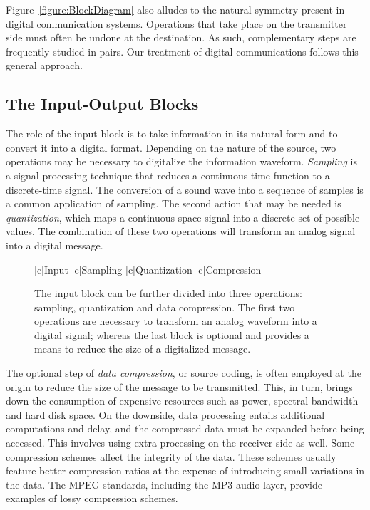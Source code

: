 Figure~\ref{figure:BlockDiagram} also alludes to the natural symmetry present in digital communication systems.
Operations that take place on the transmitter side must often be undone at the destination.
As such, complementary steps are frequently studied in pairs.
Our treatment of digital communications follows this general approach.


\subsection{The Input-Output Blocks}

The role of the input block is to take information in its natural form and to convert it into a digital format.
Depending on the nature of the source, two operations may be necessary to digitalize the information waveform.
\emph{Sampling} is a signal processing technique that reduces a continuous-time function to a discrete-time signal.
The conversion of a sound wave into a sequence of samples is a common application of sampling.
The second action that may be needed is \emph{quantization}, which maps a continuous-space signal into a discrete set of possible values.
The combination of these two operations will transform an analog signal into a digital message.

\begin{figure}[htbp]
\begin{center}
\begin{psfrags}
[c]{Input}
[c]{Sampling}
[c]{Quantization}
[c]{Compression}
\end{psfrags}
\end{center}
\caption{The input block can be further divided into three operations: sampling, quantization and data compression.
The first two operations are necessary to transform an analog waveform into a digital signal; whereas the last block is optional and provides a means to reduce the size of a digitalized message.}
\label{figure:BlockInput}
\end{figure}

The optional step of \emph{data compression}, or source coding, is often employed at the origin to reduce the size of the message to be transmitted.
This, in turn, brings down the consumption of expensive resources such as power, spectral bandwidth and hard disk space.
On the downside, data processing entails additional computations and delay, and the compressed data must be expanded before being accessed.
This involves using extra processing on the receiver side as well.
Some compression schemes affect the integrity of the data.
These schemes usually feature better compression ratios at the expense of introducing small variations in the data.
The MPEG standards, including the MP3 audio layer, provide examples of lossy compression schemes.

